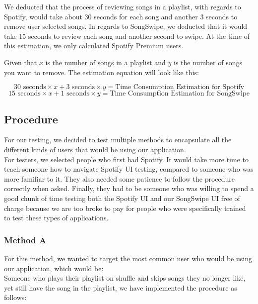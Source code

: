 \documentclass{article}
\begin{document}
We deducted that the process of reviewing songs in a playlist, with regards to Spotify, would take about 30 seconds for each song and another 3 seconds to remove user selected songs. In regards to SongSwipe, we deducted that it would take 15 seconds to review each song and another second to swipe. At the time of this estimation, we only calculated Spotify Premium users.

\begin{center}
Given that $x$ is the number of songs in a playlist and $y$ is the number of songs you want to remove. The estimation equation will look like this:
\end{center}
\begin{equation}
30 \text{ seconds} \times x + 3 \text{ seconds} \times y = \text{Time Consumption Estimation for Spotify}
\end{equation}
\begin{equation}
15 \text{ seconds} \times x + 1 \text{ seconds} \times y = \text{Time Consumption Estimation for SongSwipe}
\end{equation}
\subsection{Procedure}
    For our testing, we decided to test multiple methods to encapsulate all the different kinds of users that would be using our application. \\

    For testers, we selected people who first had Spotify. It would take more time to teach someone how to navigate Spotify UI testing, compared to someone who was more familiar to it. They also needed some patience to follow the procedure correctly when asked. Finally, they had to be someone who was willing to spend a good chunk of time testing both the Spotify UI and our SongSwipe UI free of charge because we are too broke to pay for people who were specifically trained to test these types of applications.

\subsubsection*{Method A}
For this method, we wanted to target the most common user who would be using our application, which would be:\\
    
Someone who plays their playlist on shuffle and skips songs they no longer like, yet still have the song in the playlist, we have implemented the procedure as follows: \\
\end{document}
